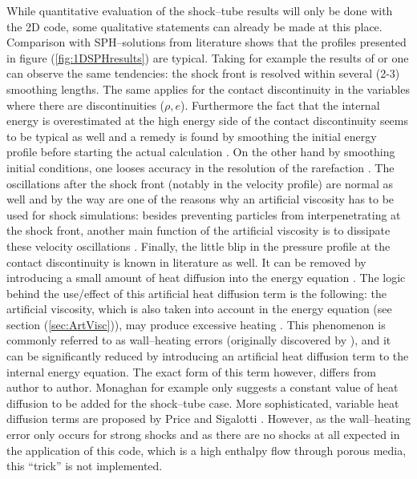\documentclass{report}
\begin{document}
While quantitative evaluation of the shock--tube results will only be done with the 2D code, some qualitative statements can already be made at this place.
Comparison with SPH--solutions from literature shows that the profiles presented in figure (\ref{fig:1DSPHresults}) are typical. Taking for example the results of \cite{Liu2003} or \cite{Monaghan1985} one can observe the same tendencies: the shock front is resolved within several (2-3) smoothing lengths. The same applies for the contact discontinuity in the variables where there are discontinuities ($\rho, e$). Furthermore the fact that the internal energy is overestimated at the high energy side of the contact discontinuity seems to be typical as well and a remedy is found by smoothing the initial energy profile before starting the actual calculation \cite{Monaghan2005,Price2004}. On the other hand by smoothing initial conditions, one looses accuracy in the resolution of the rarefaction \cite{Price2004}.  The oscillations after the shock front (notably in the velocity profile) are normal as well and by the way are one of the reasons why an artificial viscosity has to be used for shock simulations: besides preventing particles from interpenetrating at the shock front, another main function of the artificial viscosity is to dissipate these velocity oscillations \cite{Monaghan2005,Sigalotti2006}.
Finally, the little blip in the pressure profile at the contact discontinuity is known in literature as well. It can be removed by introducing a small amount of heat diffusion into the energy equation \cite{Monaghan1992}. The logic behind the use/effect of this artificial heat diffusion term is the following: the artificial viscosity, which is also taken into account in the energy equation (see section (\ref{sec:ArtVisc})), may produce excessive heating \cite{Sigalotti2006}. This phenomenon is commonly referred to as wall--heating errors (originally discovered by \cite{Noh1978}), and it can be significantly reduced by introducing an artificial heat diffusion term to the internal energy equation. The exact form of this term however, differs from author to author. Monaghan \cite{Monaghan1992} for example only suggests a constant value of heat diffusion to be added for the shock--tube case. More sophisticated, variable heat diffusion terms are proposed by Price \cite{Price2004} and Sigalotti \cite{Sigalotti2006}.
However, as the wall--heating error only occurs for strong shocks and as there are no shocks at all expected in the application of this code, which is a high enthalpy flow through porous media, this ``trick'' is not implemented. 
\end{document}
